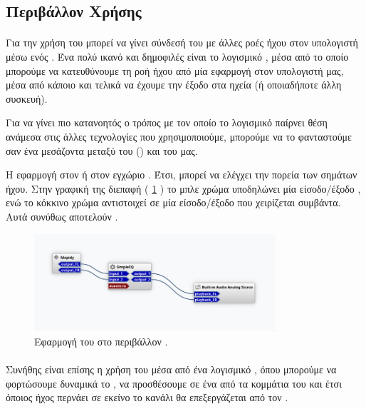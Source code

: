 \documentclass[12pt]{extarticle}
\begin{document}
\subsection{Περιβάλλον Χρήσης }

\paragraph{}

Για την χρήση του   μπορεί να γίνει 
σύνδεσή του με άλλες ροές ήχου στον υπολογιστή μέσω ενός .
Ένα πολύ ικανό και δημοφιλές είναι το λογισμικό  \cite{CarlaApp}, 
μέσα από το οποίο μπορούμε να κατευθύνουμε τη ροή ήχου από μία εφαρμογή 
στον υπολογιστή μας, μέσα από κάποιο  και τελικά να έχουμε την έξοδο 
στα ηχεία (ή οποιαδήποτε άλλη συσκευή).

Για να γίνει πιο κατανοητός ο τρόπος με τον οποίο 
το λογισμικό  παίρνει θέση ανάμεσα στις άλλες τεχνολογίες 
που χρησιμοποιούμε, μπορούμε να το φανταστούμε σαν ένα μεσάζοντα μεταξύ του 
 () και του  μας.

Η εφαρμογή   στον  
ή στον εγχώριο . Έτσι, μπορεί να ελέγχει την 
πορεία των σημάτων ήχου. Στην γραφική της διεπαφή ( \cref{fig:carla_basic} ) 
το μπλε χρώμα υποδηλώνει μία είσοδο/έξοδο , ενώ 
το κόκκινο χρώμα αντιστοιχεί σε μία είσοδο/έξοδο 
που χειρίζεται συμβάντα. Αυτά συνύθως αποτελούν .

\begin{figure}[!h]
    \centering
    \includegraphics[width=0.8\textwidth]{./assets/Carla_Basic.png}
    \caption{Εφαρμογή του  στο περιβάλλον .}
    \label{fig:carla_basic}
\end{figure}


\paragraph{}
Συνήθης είναι επίσης η χρήση του  μέσα από ένα λογισμικό 
, όπου μπορούμε να φορτώσουμε δυναμικά 
το , να προσθέσουμε σε ένα από τα κομμάτια του  
και έτσι όποιος ήχος περνάει σε εκείνο το κανάλι θα επεξεργάζεται από τον . 
\end{document}
